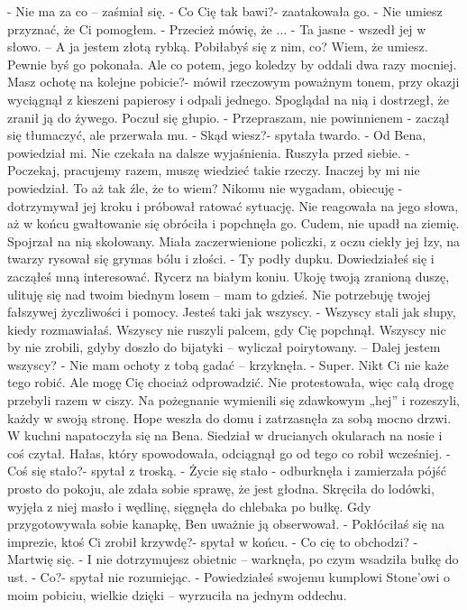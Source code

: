 \documentclass[12pt,a4paper]{book}
\begin{document}
- Nie ma za co – zaśmiał się. 
- Co Cię tak bawi?- zaatakowała go.
- Nie umiesz przyznać, że Ci pomogłem. 
- Przecież mówię, że ...
- Ta jasne - wszedł jej w słowo. – A ja jestem złotą rybką. Pobiłabyś się z nim, co? Wiem, że umiesz. Pewnie byś go pokonała. Ale co potem, jego koledzy by oddali dwa razy mocniej. Masz ochotę na kolejne pobicie?- mówił rzeczowym poważnym tonem, przy okazji wyciągnął z kieszeni papierosy i odpali jednego.
Spoglądał na nią i dostrzegł, że zranił ją do żywego. Poczuł się głupio.
- Przepraszam, nie powinnienem - zaczął się tłumaczyć, ale przerwała mu.
- Skąd wiesz?- spytała twardo.
- Od Bena, powiedział mi. 
Nie czekała na dalsze wyjaśnienia. Ruszyła przed siebie. 
- Poczekaj, pracujemy razem, muszę wiedzieć takie rzeczy. Inaczej by mi nie powiedział. To aż tak źle, że to wiem? Nikomu nie wygadam, obiecuję -  dotrzymywał jej kroku i próbował ratować sytuację.
Nie reagowała na jego słowa, aż w końcu gwałtowanie się obróciła i popchnęła go. Cudem, nie upadł na ziemię. Spojrzał na nią skołowany. Miała zaczerwienione policzki, z oczu ciekły jej łzy, na twarzy rysował się grymas bólu i złości.
- Ty podły dupku. Dowiedziałeś się i zacząłeś mną interesować. Rycerz na białym koniu. Ukoję twoją zranioną duszę, ulituję się nad twoim biednym losem – mam to gdzieś. Nie potrzebuję twojej fałszywej życzliwości i pomocy. Jesteś taki jak wszyscy. 
- Wszyscy stali jak słupy, kiedy rozmawiałaś. Wszyscy nie ruszyli palcem, gdy Cię popchnął. Wszyscy nic by nie zrobili, gdyby doszło do bijatyki – wyliczał poirytowany. – Dalej jestem wszyscy?
- Nie mam ochoty z tobą gadać – krzyknęła.
- Super. Nikt Ci nie każe tego robić. Ale mogę Cię chociaż odprowadzić. 
Nie protestowała, więc całą drogę przebyli razem w ciszy. Na pożegnanie wymienili się zdawkowym „hej” i rozeszyli, każdy w swoją stronę. 
Hope weszła do domu i zatrzasnęła za sobą mocno drzwi. W kuchni napatoczyła się na Bena. Siedział w drucianych okularach na nosie i coś czytał. Hałas, który spowodowała, odciągnął go od tego co robił wcześniej.  
- Coś się stało?- spytał z troską.
- Życie się stało - odburknęła i zamierzała pójść prosto do pokoju, ale zdała sobie sprawę, że jest głodna. 
Skręciła do lodówki, wyjęła z niej masło i wędlinę, sięgnęła do chlebaka po bułkę. Gdy przygotowywała sobie kanapkę, Ben uważnie ją obserwował. 
- Pokłóciłaś się na imprezie, ktoś Ci zrobił krzywdę?- spytał w końcu.
- Co cię to obchodzi?
- Martwię się. 
- I nie dotrzymujesz obietnic – warknęła, po czym wsadziła bułkę do ust. 
- Co?- spytał nie rozumiejąc.
- Powiedziałeś swojemu kumplowi Stone’owi o moim pobiciu, wielkie dzięki – wyrzuciła na jednym oddechu.
\end{document}
